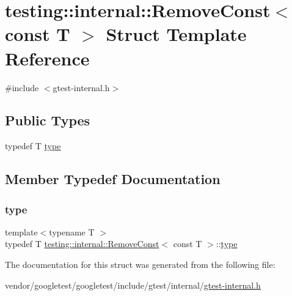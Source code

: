 \hypertarget{structtesting_1_1internal_1_1_remove_const_3_01const_01_t_01_4}{}\section{testing\+:\+:internal\+:\+:Remove\+Const$<$ const T $>$ Struct Template Reference}
\label{structtesting_1_1internal_1_1_remove_const_3_01const_01_t_01_4}


{\ttfamily \#include $<$gtest-\/internal.\+h$>$}

\subsection*{Public Types}
\begin{DoxyCompactItemize}
\item 
typedef T \hyperlink{structtesting_1_1internal_1_1_remove_const_3_01const_01_t_01_4_ac88c6824d228ab05091e5a4f1c1a95fc}{type}
\end{DoxyCompactItemize}


\subsection{Member Typedef Documentation}
\mbox{\label{structtesting_1_1internal_1_1_remove_const_3_01const_01_t_01_4_ac88c6824d228ab05091e5a4f1c1a95fc}} 
\subsubsection{\texorpdfstring{type}{type}}
{\footnotesize\ttfamily template$<$typename T $>$ \\
typedef T \hyperlink{structtesting_1_1internal_1_1_remove_const}{testing\+::internal\+::\+Remove\+Const}$<$ const T $>$\+::\hyperlink{structtesting_1_1internal_1_1_remove_const_3_01const_01_t_01_4_ac88c6824d228ab05091e5a4f1c1a95fc}{type}}



The documentation for this struct was generated from the following file\+:\begin{DoxyCompactItemize}
\item 
vendor/googletest/googletest/include/gtest/internal/\hyperlink{gtest-internal_8h}{gtest-\/internal.\+h}\end{DoxyCompactItemize}
